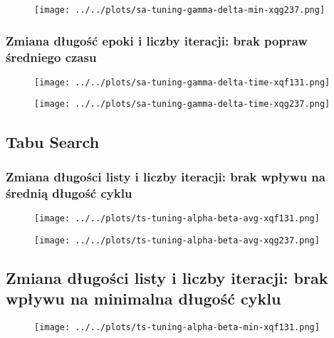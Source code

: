 \documentclass{article}
\begin{document}
    \begin{figure}[h!]
        \centering
        \texttt{[image: ../../plots/sa-tuning-gamma-delta-min-xqg237.png]}
    \end{figure}
\newpage

\subsubsection*{Zmiana długość epoki i liczby iteracji: brak popraw średniego czasu}
    \begin{figure}[h!]
        \centering
        \texttt{[image: ../../plots/sa-tuning-gamma-delta-time-xqf131.png]}
    \end{figure}

    \begin{figure}[h!]
        \centering
        \texttt{[image: ../../plots/sa-tuning-gamma-delta-time-xqg237.png]}
    \end{figure}

\newpage

\subsection*{Tabu Search}

\subsubsection*{Zmiana długości listy i liczby iteracji: brak wpływu na średnią długość cyklu}
    \begin{figure}[h!]
        \centering
        \texttt{[image: ../../plots/ts-tuning-alpha-beta-avg-xqf131.png]}
    \end{figure}
    
    \begin{figure}[h!]
        \centering
        \texttt{[image: ../../plots/ts-tuning-alpha-beta-avg-xqg237.png]}
    \end{figure}

\newpage

\subsection*{Zmiana długości listy i liczby iteracji: brak wpływu na minimalna długość cyklu}
    \begin{figure}[h!]
        \centering
        \texttt{[image: ../../plots/ts-tuning-alpha-beta-min-xqf131.png]}
    \end{figure}
    
\end{document}
